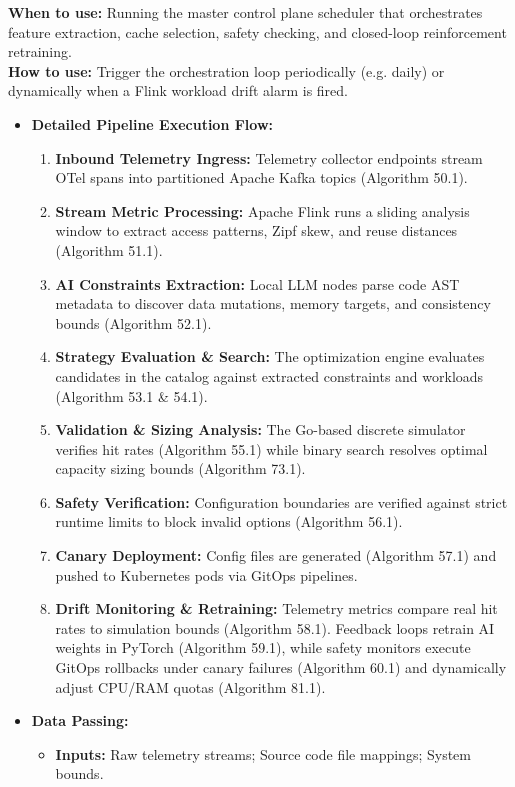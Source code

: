 \documentclass[11pt,a4paper]{article}
\theoremstyle{definition}
\begin{document}
\noindent
\textbf{When to use:} Running the master control plane scheduler that orchestrates feature extraction, cache selection, safety checking, and closed-loop reinforcement retraining.\\
\textbf{How to use:} Trigger the orchestration loop periodically (e.g. daily) or dynamically when a Flink workload drift alarm is fired.
\begin{itemize}[leftmargin=*]
  \item[] \textbf{Detailed Pipeline Execution Flow:}
  \begin{enumerate}
    \item \textbf{Inbound Telemetry Ingress:} Telemetry collector endpoints stream OTel spans into partitioned Apache Kafka topics (Algorithm 50.1).
    \item \textbf{Stream Metric Processing:} Apache Flink runs a sliding analysis window to extract access patterns, Zipf skew, and reuse distances (Algorithm 51.1).
    \item \textbf{AI Constraints Extraction:} Local LLM nodes parse code AST metadata to discover data mutations, memory targets, and consistency bounds (Algorithm 52.1).
    \item \textbf{Strategy Evaluation \& Search:} The optimization engine evaluates candidates in the catalog against extracted constraints and workloads (Algorithm 53.1 \& 54.1).
    \item \textbf{Validation \& Sizing Analysis:} The Go-based discrete simulator verifies hit rates (Algorithm 55.1) while binary search resolves optimal capacity sizing bounds (Algorithm 73.1).
    \item \textbf{Safety Verification:} Configuration boundaries are verified against strict runtime limits to block invalid options (Algorithm 56.1).
    \item \textbf{Canary Deployment:} Config files are generated (Algorithm 57.1) and pushed to Kubernetes pods via GitOps pipelines.
    \item \textbf{Drift Monitoring \& Retraining:} Telemetry metrics compare real hit rates to simulation bounds (Algorithm 58.1). Feedback loops retrain AI weights in PyTorch (Algorithm 59.1), while safety monitors execute GitOps rollbacks under canary failures (Algorithm 60.1) and dynamically adjust CPU/RAM quotas (Algorithm 81.1).
  \end{enumerate}
  \item[] \textbf{Data Passing:}
    \begin{itemize}
      \item \textbf{Inputs:} Raw telemetry streams; Source code file mappings; System bounds.

\end{itemize}
\end{itemize}
\end{document}
